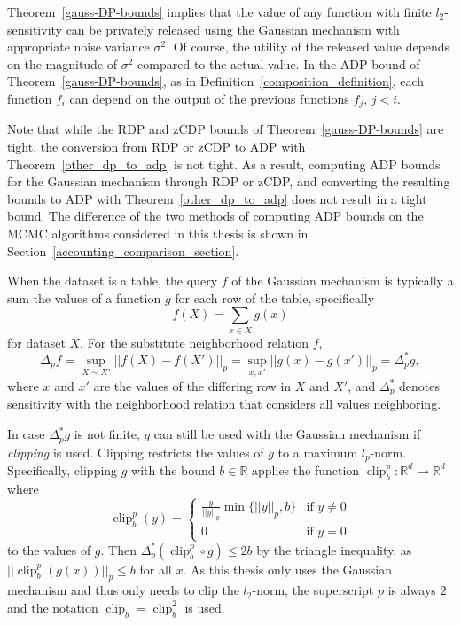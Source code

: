 \documentclass[english,twoside,openright]{HYgraduMLDS}
\newcommand{\R}{\mathbb{R}}
\DeclareMathOperator{\clip}{clip}
\begin{document}
Theorem~\ref{gauss-DP-bounds} implies that the value of any function with
finite \(l_2\)-sensitivity can be privately released using the Gaussian mechanism
with appropriate noise variance \(\sigma^2\). Of course, the utility of the
released value depends on the magnitude of \(\sigma^2\) compared to the actual
value. In the ADP bound of Theorem~\ref{gauss-DP-bounds},
as in Definition~\ref{composition_definition}, each function \(f_{i}\)
can depend on the output of the previous functions \(f_{j}\), \(j < i\).

Note that while the RDP and zCDP bounds of Theorem~\ref{gauss-DP-bounds} are
tight, the conversion from RDP or zCDP to ADP with Theorem~\ref{other_dp_to_adp}
is not tight. As a result, computing
ADP bounds for the Gaussian mechanism through RDP or zCDP, and converting
the resulting bounds to ADP with Theorem~\ref{other_dp_to_adp} does not
result in a tight bound. The difference of the two methods of computing ADP bounds
on the MCMC algorithms considered in this thesis is shown in
Section~\ref{accounting_comparison_section}.

When the dataset is a table, the query \(f\) of the Gaussian mechanism is
typically a sum the values of a function \(g\) for each row of the table,
specifically
\[
  f(X) = \sum_{x\in X} g(x)
\]
for dataset \(X\).
For the substitute neighborhood relation \(f\),
\[
  \Delta_{p}f = \sup_{X\sim X'}||f(X) - f(X')||_{p}
  = \sup_{x, x'}||g(x) - g(x')||_{p}
  = \Delta^{*}_{p}g,
\]
where \(x\) and \(x'\) are the values of the differing row in \(X\) and \(X'\),
and \(\Delta^{*}_{p}\) denotes sensitivity with the neighborhood relation that
considers all values neighboring.

In case \(\Delta^{*}_{p}g\) is not finite, \(g\) can still be used with
the Gaussian mechanism if \emph{clipping} is used. Clipping restricts the
values of \(g\) to a maximum \(l_{p}\)-norm. Specifically, clipping
\(g\) with the bound \(b\in \R\) applies
the function \(\clip_{b}^{p}\colon \R^{d}\to \R^{d}\) where
\[
  \clip_{b}^{p}(y) =
  \begin{cases}
    \frac{y}{||y||_{p}}\min\{||y||_{p}, b\} & \text{if } y \neq 0\\
    0 & \text{if } y = 0
  \end{cases}
\]
to the values of \(g\). Then \(\Delta^{*}_{p}(\clip_{b}^{p} \circ g) \leq 2b\) by the
triangle inequality, as \(||\clip_{b}^{p}(g(x))||_{p} \leq b\) for
all \(x\). As this thesis only uses the Gaussian mechanism and
thus only needs to clip the \(l_{2}\)-norm, the superscript \(p\) is always
\(2\) and the notation \(\clip_{b} = \clip_{b}^{2}\) is used.
\end{document}

